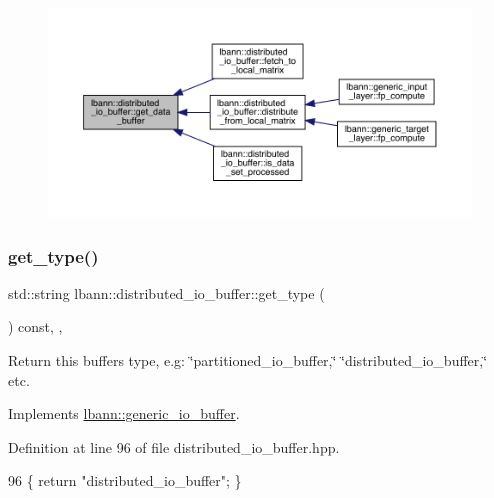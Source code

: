 \begin{figure}[H]
\begin{center}
\leavevmode
\includegraphics[width=350pt]{classlbann_1_1distributed__io__buffer_ac176f3fced1191534a985f831136aa3e_icgraph}
\end{center}
\end{figure}
\mbox{\label{classlbann_1_1distributed__io__buffer_a58e30ff6d96678b35b2470e1d292967c}} 
\subsubsection{\texorpdfstring{get\+\_\+type()}{get\_type()}}
{\footnotesize\ttfamily std\+::string lbann\+::distributed\+\_\+io\+\_\+buffer\+::get\+\_\+type (\begin{DoxyParamCaption}{ }\end{DoxyParamCaption}) const\hspace{0.3cm}{\ttfamily [inline]}, {\ttfamily [override]}, {\ttfamily [virtual]}}

Return this buffer\textquotesingle{}s type, e.\+g\+: \char`\"{}partitioned\+\_\+io\+\_\+buffer,\char`\"{} \char`\"{}distributed\+\_\+io\+\_\+buffer,\char`\"{} etc. 

Implements \hyperlink{classlbann_1_1generic__io__buffer_adc77c0a280f8a200a8d8495c3a371ebb}{lbann\+::generic\+\_\+io\+\_\+buffer}.



Definition at line 96 of file distributed\+\_\+io\+\_\+buffer.\+hpp.


\begin{DoxyCode}
96 \{ \textcolor{keywordflow}{return} \textcolor{stringliteral}{"distributed\_io\_buffer"}; \}
\end{DoxyCode}
\mbox{\label{classlbann_1_1distributed__io__buffer_a6fe05935e14186d2dd1975ecab9be10e}} 
